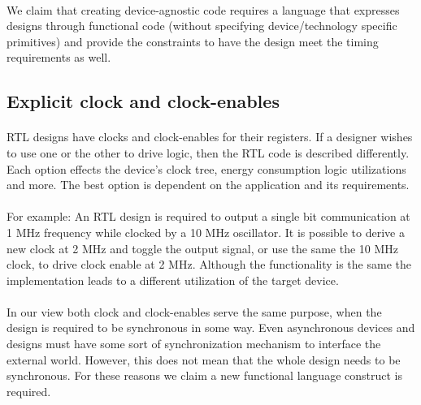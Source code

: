 \paragraph{}We claim that creating device-agnostic code requires a language that expresses designs through functional code (without specifying device/technology specific primitives) and provide the constraints to have the design meet the timing requirements as well.

\subsection*{Explicit clock and clock-enables}
\paragraph{}RTL designs have clocks and clock-enables for their registers. If a designer wishes to use one or the other to drive logic, then the RTL code is described differently. Each option effects the device's clock tree, energy consumption logic utilizations and more. The best option is dependent on the application and its requirements.
\paragraph{}For example: An RTL design is required to output a single bit communication at 1 MHz frequency while clocked by a 10 MHz oscillator. It is possible to derive a new clock at 2 MHz and toggle the output signal, or use the same the 10 MHz clock, to drive clock enable at 2 MHz. Although the functionality is the same the implementation leads to a different utilization of the target device.
\paragraph{}In our view both clock and clock-enables serve the same purpose, when the design is required to be synchronous in some way. Even asynchronous devices and designs must have some sort of synchronization mechanism to interface the external world. However, this does not mean that the whole design needs to be synchronous. For these reasons we claim a new functional language construct is required.

